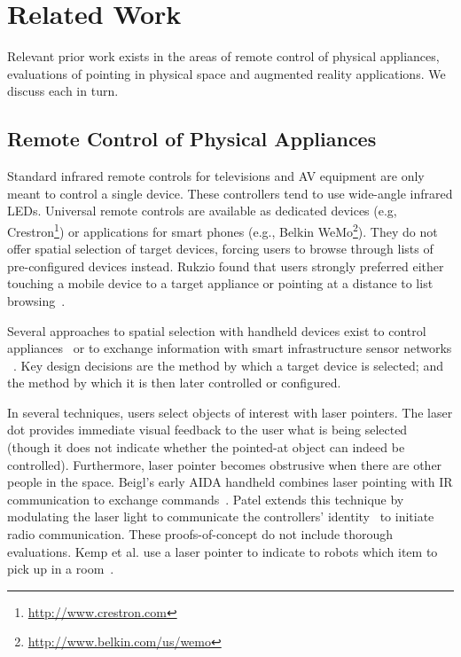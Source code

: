 \section{Related Work}
Relevant prior work exists in the areas of remote control of physical appliances, evaluations of pointing in physical space and augmented reality applications. We discuss each in turn.

\subsection{Remote Control of Physical Appliances}
Standard infrared remote controls for televisions and AV equipment are only meant to control a single device. These controllers tend to use wide-angle infrared LEDs. Universal remote controls are available as dedicated devices (e.g, Crestron\footnote{\url{http://www.crestron.com}}) or applications for smart phones (e.g., Belkin WeMo\footnote{\url{http://www.belkin.com/us/wemo}}). They do not offer spatial selection of target devices, forcing users to browse through lists of pre-configured devices instead. Rukzio found that users strongly preferred either touching a mobile device to a target appliance or pointing at a distance to list browsing~\cite{rukzio_experimental_2006}.

Several approaches to spatial selection with handheld devices exist to control appliances~\cite{beigl_point_1999,patel_2-way_2003,wilson_xwand:_2003,schmidt_picontrol:_2012} or to exchange information with smart infrastructure sensor networks ~\cite{lifton_tricorder:_2007,mittal_ubicorder:_2011,costanza_sensortune:_2010}. Key design decisions are the method by which a target device is selected; and the method by which it is then later controlled or configured.

In several techniques, users select objects of interest with laser pointers. The laser dot provides immediate visual feedback to the user what is being selected (though it does not indicate whether the pointed-at object can indeed be controlled). Furthermore, laser pointer becomes obstrusive when there are other people in the space. Beigl's early AIDA handheld combines laser pointing with IR communication to exchange commands~\cite{beigl_point_1999}. Patel extends this technique by modulating the laser light to communicate the controllers' identity~\cite{patel_2-way_2003} to initiate radio communication. These proofs-of-concept do not include thorough evaluations. Kemp et al. use a laser pointer to indicate to robots which item to pick up in a room~\cite{kemp_point-and-click_2008}. 

